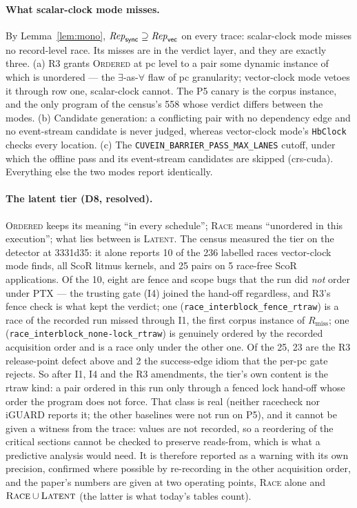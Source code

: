 \documentclass[11pt]{article}
\theoremstyle{remark}
\begin{document}
\paragraph{What scalar-clock mode misses.} By Lemma~\ref{lem:mono},
$\mathit{Rep}_{\mathsf{sync}}\supseteq\mathit{Rep}_{\mathsf{vec}}$ on every trace: scalar-clock mode
misses no record-level race. Its misses are in the verdict layer, and they are exactly
three. (a) R3 grants \textsc{Ordered} at pc level to a pair some dynamic instance of
which is unordered --- the $\exists$-as-$\forall$ flaw of pc granularity; vector-clock
mode vetoes it through row one, scalar-clock cannot. The P5 canary is the corpus
instance, and the only program of the census's 558 whose verdict differs between the
modes. (b) Candidate generation: a conflicting pair with no dependency edge and no
event-stream candidate is never judged, whereas vector-clock mode's \texttt{HbClock} checks every location. (c) The
\texttt{CUVEIN\_BARRIER\_PASS\_MAX\_LANES} cutoff, under which the offline pass and its
event-stream candidates are skipped (crs-cuda). Everything else the two modes report
identically.

\paragraph{The latent tier (D8, resolved).} \textsc{Ordered} keeps its meaning ``in
every schedule''; \textsc{Race} means ``unordered in this execution''; what lies between
is \textsc{Latent}. The census measured the tier on the detector at 3331d35: it alone
reports 10 of the 236 labelled races vector-clock mode finds, all ScoR litmus kernels,
and 25 pairs on 5 race-free ScoR applications. Of the 10, eight are fence and scope bugs
that the run did \emph{not} order under PTX --- the trusting gate (I4) joined the hand-off
regardless, and R3's fence check is what kept the verdict; one
(\texttt{race\_interblock\_fence\_rtraw}) is a race of the recorded run missed through I1,
the first corpus instance of $R_{\mathrm{miss}}$; one
(\texttt{race\_interblock\_none-lock\_rtraw}) is genuinely ordered by the recorded
acquisition order and is a race only under the other one. Of the 25, 23 are the R3
release-point defect above and 2 the success-edge idiom that the per-pc gate rejects. So
after I1, I4 and the R3 amendments, the tier's own content is the rtraw kind: a pair
ordered in this run only through a fenced lock hand-off whose order the program does not
force. That class is real (neither racecheck nor iGUARD reports it; the other baselines
were not run on P5), and it cannot be given a witness from the trace: values are not
recorded, so a reordering of the critical sections cannot be checked to preserve
reads-from, which is what a predictive analysis would need. It is therefore reported as a
warning with its own precision, confirmed where possible by re-recording in the other
acquisition order, and the paper's numbers are given at two operating points,
\textsc{Race} alone and $\textsc{Race}\cup\textsc{Latent}$ (the latter is what today's
tables count).
\end{document}
